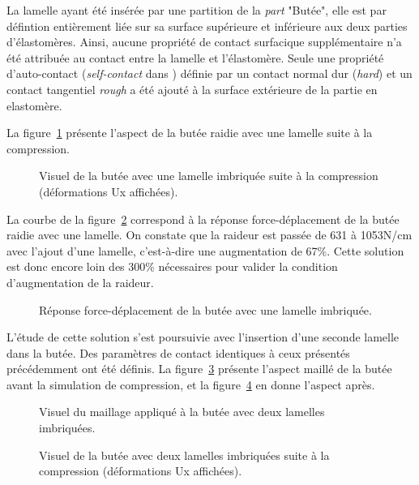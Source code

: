 ﻿\documentclass{article}
\newcommand{\abaqus}{\bsc{Abaqus}\xspace}
\begin{document}
La lamelle ayant été insérée par une partition de la \textit{part} "Butée", elle est par défintion entièrement liée sur sa surface supérieure et inférieure aux deux parties d'élastomères. Ainsi, aucune propriété de contact surfacique supplémentaire n'a été attribuée au contact entre la lamelle et l'élastomère. Seule une propriété d'auto-contact (\textit{self-contact} dans \abaqus) définie par un contact normal dur (\textit{hard}) et un contact tangentiel \textit{rough} a été ajouté à la surface extérieure de la partie en elastomère. 

La figure~\ref{fig8} présente l'aspect de la butée raidie avec une lamelle suite à la compression.

\begin{figure}[!h]
	\centering
	\caption{Visuel de la butée avec une lamelle imbriquée suite à la compression (déformations Ux affichées).}
	\label{fig8}
\end{figure}

La courbe de la figure~\ref{fig9} correspond à la réponse force-déplacement de la butée raidie avec une lamelle. On constate que la raideur est passée de 631 à 1053N/cm avec l'ajout d'une lamelle, c'est-à-dire une augmentation de 67\%. Cette solution est donc encore loin des 300\% nécessaires pour valider la condition d'augmentation de la raideur.

\begin{figure}[!h]
	\centering
	\caption{Réponse force-déplacement de la butée avec une lamelle imbriquée.}
	\label{fig9}
\end{figure}

L'étude de cette solution s'est poursuivie avec l'insertion d'une seconde lamelle dans la butée. Des paramètres de contact identiques à ceux présentés précédemment ont été définis. La figure~\ref{fig10} présente l'aspect maillé de la butée avant la simulation de compression, et la figure~\ref{fig11} en donne l'aspect après.

\begin{figure}[!h]
	\centering
	\caption{Visuel du maillage appliqué à la butée avec deux lamelles imbriquées.}
	\label{fig10}
\end{figure}

\begin{figure}[!h]
	\centering
	\caption{Visuel de la butée avec deux lamelles imbriquées suite à la compression (déformations Ux affichées).}
	\label{fig11}
\end{figure}
\end{document}
